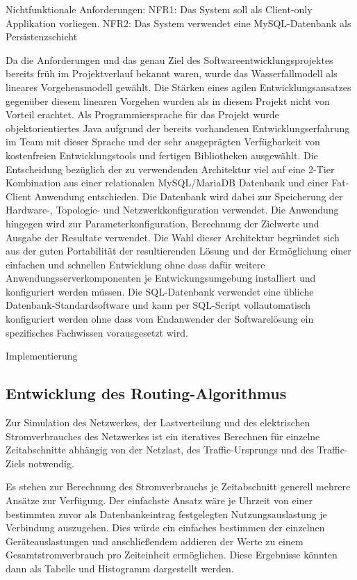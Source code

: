 \documentclass[12pt,titlepage]{article}
\begin{document}
Nichtfunktionale Anforderungen:
NFR1: Das System soll als Client-only Applikation vorliegen.
NFR2: Das System verwendet eine MySQL-Datenbank als Persistenzschicht

Da die Anforderungen und das genau Ziel des Softwareentwicklungsprojektes bereits früh im Projektverlauf bekannt waren, wurde das Wasserfallmodell als lineares Vorgehensmodell gewählt. Die Stärken eines agilen Entwicklungsansatzes gegenüber diesem linearen Vorgehen wurden als in diesem Projekt nicht von Vorteil erachtet.
Als Programmiersprache für das Projekt wurde objektorientiertes Java aufgrund der bereits vorhandenen Entwicklungserfahrung im Team mit dieser Sprache und der sehr ausgeprägten Verfügbarkeit von kostenfreien Entwicklungstools und fertigen Bibliotheken ausgewählt.
Die Entscheidung bezüglich der zu verwendenden Architektur viel auf eine 2-Tier Kombination aus einer relationalen MySQL/MariaDB Datenbank und einer Fat-Client Anwendung entschieden. Die Datenbank wird dabei zur Speicherung der Hardware-, Topologie- und Netzwerkkonfiguration verwendet. Die Anwendung hingegen wird zur Parameterkonfiguration, Berechnung der Zielwerte und Ausgabe der Resultate verwendet.
Die Wahl dieser Architektur begründet sich aus der guten Portabilität der resultierenden Lösung und der Ermöglichung einer einfachen und schnellen Entwicklung ohne dass dafür weitere Anwendungsserverkomponenten je Entwickungsumgebung installiert und konfiguriert werden müssen. Die SQL-Datenbank verwendet eine übliche Datenbank-Standardsoftware und kann per SQL-Script vollautomatisch konfiguriert werden ohne dass vom Endanwender der Softwarelösung ein spezifisches Fachwissen vorausgesetzt wird. 

Implementierung
\subsection{Entwicklung des Routing-Algorithmus}
Zur Simulation des Netzwerkes, der Lastverteilung und des elektrischen Stromverbrauches des Netzwerkes ist ein iteratives Berechnen für einzelne Zeitabschnitte abhängig von der Netzlast, des Traffic-Ursprungs und des Traffic-Ziels notwendig.

Es stehen zur Berechnung des Stromverbrauchs je Zeitabschnitt generell mehrere Ansätze zur Verfügung. Der einfachste Ansatz wäre je Uhrzeit von einer bestimmten zuvor als Datenbankeintrag festgelegten Nutzungsauslastung je Verbindung auszugehen. Dies würde ein einfaches bestimmen der einzelnen Geräteauslastungen und anschließendem addieren der Werte zu einem Gesamtstromverbrauch pro Zeiteinheit ermöglichen. Diese Ergebnisse könnten dann als Tabelle und Histogramm dargestellt werden.
\end{document}
